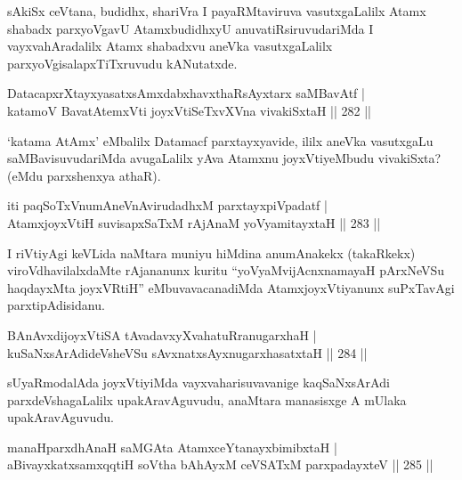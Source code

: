 \begin{artha}
sAkiSx ceVtana, budidhx, shariVra I payaRMtaviruva vasutxgaLalilx Atamx shabadx parxyoVgavU AtamxbudidhxyU anuvatiRsiruvudariMda I vayxvahAradalilx Atamx shabadxvu aneVka vasutxgaLalilx parxyoVgisalapxTiTxruvudu kANutatxde.
\end{artha}

\begin{shl}
DatacapxrXtayxyasatxsAmxdabxhavxthaRsAyxtarx saMBavAtf | \\
katamoV BavatA\s \s temxVti joyxVtiSeTxvXVna vivakiSxtaH \hfill ||  282 || 
\end{shl}

\begin{artha}
`katama AtAmx' eMbalilx Datamacf parxtayxyavide, ililx aneVka vasutxgaLu saMBavisuvudariMda avugaLalilx yAva Atamxnu joyxVtiyeMbudu vivakiSxta? (eMdu parxshenxya athaR).
\end{artha}

\begin{shl}
iti paqSoTxV\s numAneVnAvirudadhxM parxtayxpiVpadatf | \\
AtamxjoyxVtiH suvisapxSaTxM rAjAnaM yoV\s yamitayxtaH \hfill ||  283 || 
\end{shl}

\begin{artha}
I riVtiyAgi keVLida naMtara muniyu hiMdina anumAnakekx (takaRkekx) viroVdhavilalxdaMte rAjananunx kuritu ``yoV\s yaMvijAcnxnamayaH pArxNeVSu haqdayxMta joyxVRtiH'' eMbuvavacanadiMda AtamxjoyxVtiyanunx suPxTavAgi parxtipAdisidanu.
\end{artha}


\begin{shl}
BAnAvxdijoyxVtiSA tAvadavxyXvahatuRranugarxhaH | \\
kuSaNxsArAdideVsheVSu sAvxnatxsAyxnugarxhasatxtaH \hfill ||  284 ||  
\end{shl}

\begin{artha}
sUyaRmodalAda joyxVtiyiMda vayxvaharisuvavanige kaqSaNxsArAdi parxdeVshagaLalilx upakAravAguvudu, anaMtara manasisxge A mUlaka upakAravAguvudu.
\end{artha}

\begin{shl}
manaHparxdhAnaH saMGAta AtamxceYtanayxbimibxtaH | \\
aBivayxkatxsamxqqtiH soV\s tha bAhAyxM ceVSATxM parxpadayxteV \hfill ||  285 ||  
\end{shl}

